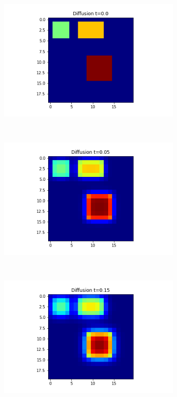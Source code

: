 \documentclass[10pt,a4paper]{article}
\begin{document}
    	\begin{figure}[!h]
    		\centering
    		\begin{subfigure}[b]{0.25\textwidth}
    			\includegraphics[width=\textwidth]{images/nolongrange-t0.png}
    			\caption{}
    			\label{nolongranget0}
    		\end{subfigure}~
    		\begin{subfigure}[b]{0.25\textwidth}
    			\includegraphics[width= \textwidth]{images/nolongrange-t05.png}
    			\caption{}
    			\label{nolongranget05}
    		\end{subfigure}~
    		\begin{subfigure}[b]{0.25\textwidth}
    			\includegraphics[width= \textwidth]{images/nolongrange-t3.png}

\end{subfigure}
\end{figure}
\end{document}
